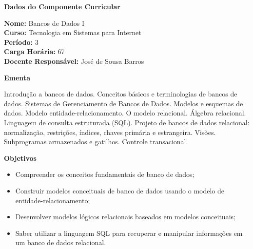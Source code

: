 

\begin{snugshade}\begin{center}\textbf{
	Dados do Componente Curricular
}\end{center}\end{snugshade}

\noindent 	\textbf{Nome:} Bancos de Dados I
\\ 			\textbf{Curso:} Tecnologia em Sistemas para Internet
\\ 			\textbf{Período:} \unit{3}{\degree}
\\ 			\textbf{Carga Horária:} \unit{67}{\hour}
\\ 			\textbf{Docente Responsável:} José de Sousa Barros 


\begin{snugshade}\begin{center}\textbf{
    Ementa
\vphantom{q}}\end{center}\end{snugshade}

\noindent
Introdução a bancos de dados. Conceitos básicos e terminologias de bancos de dados. Sistemas de Gerenciamento de Bancos de Dados. Modelos e esquemas de dados. Modelo entidade-relacionamento. O modelo relacional. Álgebra relacional. Linguagem de consulta estruturada (SQL). Projeto de bancos de dados relacional: normalização, restrições, índices, chaves primária e estrangeira. Visões. Subprogramas armazenados e gatilhos. Controle transacional.


\begin{snugshade}\begin{center}\textbf{
    Objetivos
}\end{center}\end{snugshade}


\begin{itemize}

\item Compreender os conceitos fundamentais de banco de dados;
\item Construir modelos conceituais de banco de dados usando o modelo de entidade-relacionamento;
\item Desenvolver modelos lógicos relacionais baseados em modelos conceituais;
\item Saber utilizar a linguagem SQL para recuperar e manipular informações em um banco de dados relacional.

\end{itemize}

